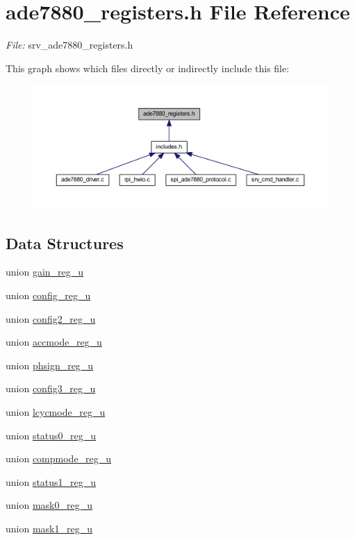 \hypertarget{a00036}{\section{ade7880\-\_\-registers.\-h File Reference}
\label{de/d8c/a00036}
}


{\itshape File\-:} srv\-\_\-ade7880\-\_\-registers.\-h \par
  


This graph shows which files directly or indirectly include this file\-:\nopagebreak
\begin{figure}[H]
\begin{center}
\leavevmode
\includegraphics[width=350pt]{d3/dea/a00046}
\end{center}
\end{figure}
\subsection*{Data Structures}
\begin{DoxyCompactItemize}
\item 
union \hyperlink{a00025}{gain\-\_\-reg\-\_\-u}
\item 
union \hyperlink{a00024}{config\-\_\-reg\-\_\-u}
\item 
union \hyperlink{a00022}{config2\-\_\-reg\-\_\-u}
\item 
union \hyperlink{a00010}{accmode\-\_\-reg\-\_\-u}
\item 
union \hyperlink{a00031}{phsign\-\_\-reg\-\_\-u}
\item 
union \hyperlink{a00023}{config3\-\_\-reg\-\_\-u}
\item 
union \hyperlink{a00026}{lcycmode\-\_\-reg\-\_\-u}
\item 
union \hyperlink{a00032}{status0\-\_\-reg\-\_\-u}
\item 
union \hyperlink{a00021}{compmode\-\_\-reg\-\_\-u}
\item 
union \hyperlink{a00033}{status1\-\_\-reg\-\_\-u}
\item 
union \hyperlink{a00027}{mask0\-\_\-reg\-\_\-u}
\item 
union \hyperlink{a00028}{mask1\-\_\-reg\-\_\-u}
\end{DoxyCompactItemize}
